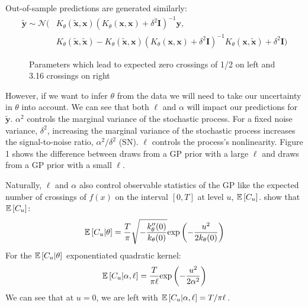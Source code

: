 \documentclass{article}
\newcommand{\Exp}[1]{\ensuremath{\mathbb{E} \lb #1 \rb}}
\newcommand{\lb}{\ensuremath{\left[}}
\newcommand{\rb}{\ensuremath{\right]}}
\begin{document}
Out-of-sample predictions are generated similarly:
\begin{align*} 
  \mathbf{\tilde{y}} \sim
  \mathcal{N}(&K_\theta(\mathbf{\tilde{x}},\mathbf{x}) (K_\theta(\mathbf{x},\mathbf{x}) +
  \delta ^ 2 \mathbf{I})^{-1}\mathbf{y},  
   \\ & K_\theta(\mathbf{\tilde{x}},\mathbf{\tilde{x}}) -K_\theta(\mathbf{\tilde{x}},\mathbf{x}) (K_\theta(\mathbf{x},\mathbf{x}) + \delta ^ 2 \mathbf{I})^{-1}K_\theta(\mathbf{x},\mathbf{\tilde{x}}) + \delta ^ 2 \mathbf{I})
\end{align*}
\begin{figure} \label{prior-lat-draws}
  \caption{Parameters which lead to expected zero crossings of 1/2 on left and 3.16 crossings on right} \label{prior-lat-draws}
\end{figure}
However, if we want to infer $\theta$ from the data we will need to take our
uncertainty in $\theta$ into account. We can see that both $\ell$ and $\alpha$
will impact our predictions for $\tilde{\mathbf{y}}$. $\alpha^2$ controls the
marginal variance of the stochastic process. For a fixed noise variance,
$\delta^2$, increasing the marginal variance of the stochastic process
increases the signal-to-noise ratio, $\alpha^2 / \delta^2$ (SN). $\ell$
controls the process's nonlinearity. Figure 1 shows the
difference between draws from a GP prior with a large $\ell$ and draws from a
GP prior with a small $\ell$.


Naturally, $\ell$ and $\alpha$ also control observable statistics of the
GP like the expected number of crossings of $f(x)$ on the interval $[0,
T]$ at level $u$, $\Exp{C_u}$. \citet{cramer2004stationary} show that $\Exp{C_u}$:
\begin{align*} 
  \Exp{C_u | \theta} = \dfrac{T}{\pi} 
\sqrt{-\dfrac{k_\theta^{\prime \prime}(0)}{k_\theta(0)}}
  \text{exp}\left(-\dfrac{u^2}{2k_\theta(0)}\right)
\end{align*} 
For the $\Exp{C_u | \theta}$ exponentiated quadratic kernel:
\begin{align*} 
  \Exp{C_u | \alpha, \ell} = \dfrac{T}{\pi \ell}\text{exp}\left(-\dfrac{u^2}{2 \alpha ^ 2} \right)
\end{align*} 
We can see that at $u = 0$, we are left with $\Exp{C_u | \alpha, \ell} = T / \pi \ell$.  
\end{document}
